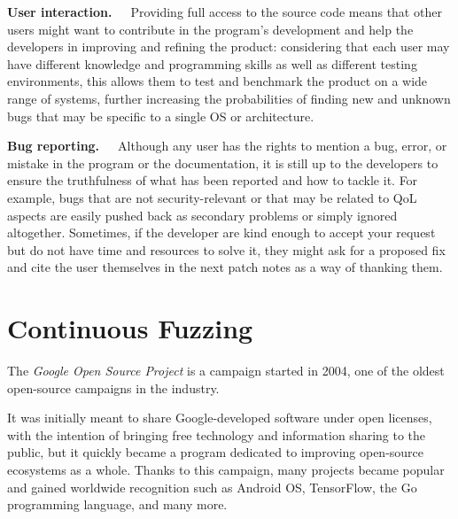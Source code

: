 \textbf{User interaction.}\ \ \ Providing full access to the source code means that other users might want to contribute in the program's development and help the developers in improving and refining the product: considering that each user may have different knowledge and programming skills as well as different testing environments, this allows them to test and benchmark the product on a wide range of systems, further increasing the probabilities of finding new and unknown bugs that may be specific to a single OS or architecture.

\textbf{Bug reporting.}\ \ \ Although any user has the rights to mention a bug, error, or mistake in the program or the documentation, it is still up to the developers to ensure the truthfulness of what has been reported and how to tackle it. For example, bugs that are not security-relevant or that may be related to QoL aspects are easily pushed back as secondary problems or simply ignored altogether. Sometimes, if the developer are kind enough to accept your request but do not have time and resources to solve it, they might ask for a proposed fix and cite the user themselves in the next patch notes as a way of thanking them.



\newpage
\section{Continuous Fuzzing}

The \textit{Google Open Source Project} \cite{google_oss} is a campaign started in 2004, one of the oldest open-source campaigns in the industry. 

It was initially meant to share Google-developed software under open licenses, with the intention of bringing free technology and information sharing to the public, but it quickly became a program dedicated to improving open-source ecosystems as a whole. 
Thanks to this campaign, many projects became popular and gained worldwide recognition such as Android OS, TensorFlow, the Go programming language, and many more.

